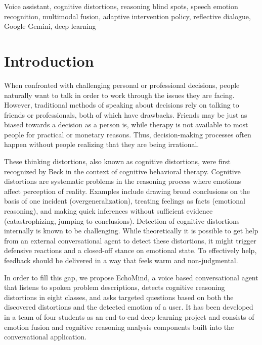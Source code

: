 \documentclass[conference]{IEEEtran}
\begin{document}
\begin{IEEEkeywords}
Voice assistant, cognitive distortions, reasoning blind spots, speech emotion recognition, multimodal fusion, adaptive intervention policy, reflective dialogue, Google Gemini, deep learning
\end{IEEEkeywords}

\section{Introduction}
When confronted with challenging personal or professional decisions, people naturally want to talk in order to work through the issues they are facing. However, traditional methods of speaking about decisions rely on talking to friends or professionals, both of which have drawbacks. Friends may be just as biased towards a decision as a person is, while therapy is not available to most people for practical or monetary reasons. Thus, decision-making processes often happen without people realizing that they are being irrational.

These thinking distortions, also known as cognitive distortions, were first recognized by Beck in the context of cognitive behavioral therapy. Cognitive distortions are systematic problems in the reasoning process where emotions affect perception of reality. Examples include drawing broad conclusions on the basis of one incident (overgeneralization), treating feelings as facts (emotional reasoning), and making quick inferences without sufficient evidence (catastrophizing, jumping to conclusions). Detection of cognitive distortions internally is known to be challenging. While theoretically it is possible to get help from an external conversational agent to detect these distortions, it might trigger defensive reactions and a closed-off stance on emotional state. To effectively help, feedback should be delivered in a way that feels warm and non-judgmental.

In order to fill this gap, we propose EchoMind, a voice based conversational agent that listens to spoken problem descriptions, detects cognitive reasoning distortions in eight classes, and asks targeted questions based on both the discovered distortions and the detected emotion of a user. It has been developed in a team of four students as an end-to-end deep learning project and consists of emotion fusion and cognitive reasoning analysis components built into the conversational application.
\end{document}
